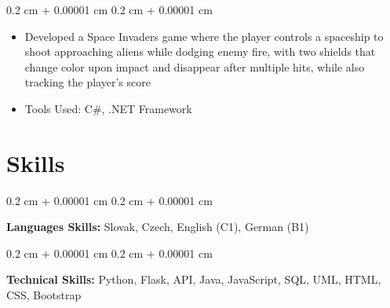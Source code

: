 \documentclass[10pt, letterpaper]{article}
\newenvironment{highlights}{
    \begin{itemize}[
        topsep=0.10 cm,
        parsep=0.10 cm,
        partopsep=0pt,
        itemsep=0pt,
        leftmargin=0.4 cm + 10pt
    ]
}{
    \end{itemize}
} %
\newenvironment{onecolentry}{
    \begin{adjustwidth}{
        0.2 cm + 0.00001 cm
    }{
        0.2 cm + 0.00001 cm
    }
}{
    \end{adjustwidth}
} %
\begin{document}
        \begin{onecolentry}
            \begin{highlights}
                 \item Developed a Space Invaders game where the player controls a spaceship to shoot approaching aliens while dodging enemy fire, with two shields that change color upon impact and disappear after multiple hits, while also tracking the player's score
                \item Tools Used: C\#, .NET Framework
            \end{highlights}
        \end{onecolentry}

            
            

    
    \section{Skills}



        
        \begin{onecolentry}
            \textbf{Languages Skills:} Slovak, Czech, English (C1), German (B1)
        \end{onecolentry}

        \vspace{0.2 cm}

        \begin{onecolentry}
            \textbf{Technical Skills:} Python, Flask, API, Java, JavaScript, SQL, UML, HTML, CSS, Bootstrap
        \end{onecolentry}


    
\end{document}
